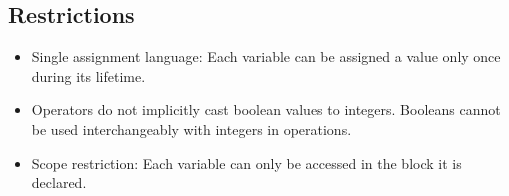 \subsection*{Restrictions}

\begin{itemize}
\item
  Single assignment language: Each variable
  can be assigned a value only once during its
  lifetime.
  
\item
  Operators do not implicitly cast boolean 
  values to integers. Booleans cannot be used 
  interchangeably with integers in operations.

\item
  Scope restriction: Each variable
  can only be accessed in the block it is
  declared.
\end{itemize}

